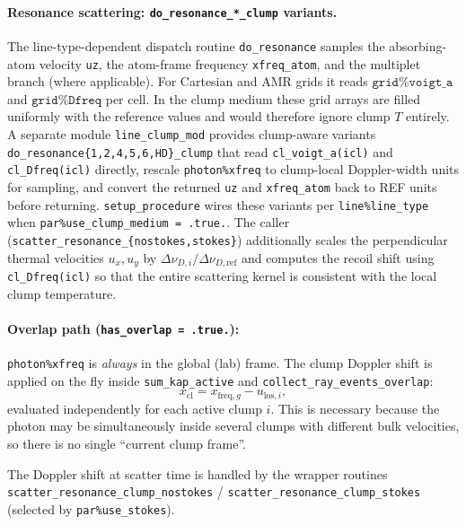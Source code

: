 \documentclass[english,a4paper]{my_memo}
\begin{document}
\paragraph{Resonance scattering: \texttt{do\_resonance\_*\_clump} variants.}
The line-type-dependent dispatch routine \texttt{do\_resonance} samples
the absorbing-atom velocity \texttt{uz}, the atom-frame frequency
\texttt{xfreq\_atom}, and the multiplet branch (where applicable).
For Cartesian and AMR grids it reads
$\texttt{grid\%voigt\_a}$ and $\texttt{grid\%Dfreq}$ per cell.  In the
clump medium these grid arrays are filled uniformly with the reference
values and would therefore ignore clump $T$ entirely.  A separate
module \texttt{line\_clump\_mod} provides clump-aware variants
\texttt{do\_resonance\{1,2,4,5,6,HD\}\_clump} that read
\texttt{cl\_voigt\_a(icl)} and \texttt{cl\_Dfreq(icl)} directly, rescale
\texttt{photon\%xfreq} to clump-local Doppler-width units for sampling,
and convert the returned \texttt{uz} and \texttt{xfreq\_atom} back to
REF units before returning.  \texttt{setup\_procedure} wires these
variants per \texttt{line\%line\_type} when
\texttt{par\%use\_clump\_medium = .true.}.  The caller
(\texttt{scatter\_resonance\_\{nostokes,stokes\}}) additionally scales
the perpendicular thermal velocities $u_x, u_y$ by
$\Delta\nu_{D,i}/\Delta\nu_{D,\text{ref}}$ and computes the recoil
shift using \texttt{cl\_Dfreq(icl)} so that the entire scattering kernel
is consistent with the local clump temperature.

\paragraph{Overlap path (\texttt{has\_overlap = .true.}):}
\texttt{photon\%xfreq} is \emph{always} in the global (lab) frame.  The
clump Doppler shift is applied on the fly inside
\texttt{sum\_kap\_active} and \texttt{collect\_ray\_events\_overlap}:
\begin{equation}
  x_\mathrm{cl} = x_{\mathrm{freq},g} - u_{\mathrm{los},i},
\end{equation}
evaluated independently for each active clump $i$.  This is necessary
because the photon may be simultaneously inside several clumps with
different bulk velocities, so there is no single ``current clump frame''.
\begin{sloppypar}
The Doppler shift at scatter time is handled by the wrapper routines
\texttt{scatter\_resonance\_clump\_nostokes} /
\texttt{scatter\_resonance\_clump\_stokes} (selected by
\texttt{par\%use\_stokes}).
\end{sloppypar}
\end{document}
